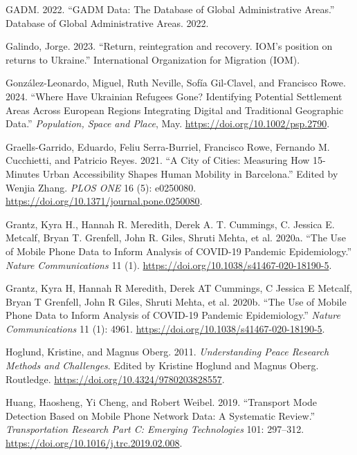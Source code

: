 \documentclass[
  sn-nature,
  11pt,
]{sn-jnl}
\newlength{\cslhangindent}
\newenvironment{CSLReferences}[2] %
 {\begin{list}{}{%
  \setlength{\itemindent}{0pt}
  \setlength{\leftmargin}{0pt}
  \setlength{\parsep}{0pt}
  \ifodd #1
   \setlength{\leftmargin}{\cslhangindent}
   \setlength{\itemindent}{-1\cslhangindent}
  \fi
  \setlength{\itemsep}{#2\baselineskip}}}
 {\end{list}}
\begin{document}
\begin{CSLReferences}{1}{0}
GADM. 2022. {``{GADM} Data: The Database of Global Administrative
Areas.''} Database of Global Administrative Areas. 2022.

Galindo, Jorge. 2023. {``{Return, reintegration and recovery. IOM's
position on returns to Ukraine}.''} {International Organization for
Migration (IOM)}.

González-Leonardo, Miguel, Ruth Neville, Sofía Gil-Clavel, and Francisco
Rowe. 2024. {``Where Have Ukrainian Refugees Gone? Identifying Potential
Settlement Areas Across European Regions Integrating Digital and
Traditional Geographic Data.''} \emph{Population, Space and Place}, May.
\url{https://doi.org/10.1002/psp.2790}.

Graells-Garrido, Eduardo, Feliu Serra-Burriel, Francisco Rowe, Fernando
M. Cucchietti, and Patricio Reyes. 2021. {``A City of Cities: Measuring
How 15-Minutes Urban Accessibility Shapes Human Mobility in
Barcelona.''} Edited by Wenjia Zhang. \emph{PLOS ONE} 16 (5): e0250080.
\url{https://doi.org/10.1371/journal.pone.0250080}.

Grantz, Kyra H., Hannah R. Meredith, Derek A. T. Cummings, C. Jessica E.
Metcalf, Bryan T. Grenfell, John R. Giles, Shruti Mehta, et al. 2020a.
{``The Use of Mobile Phone Data to Inform Analysis of COVID-19 Pandemic
Epidemiology.''} \emph{Nature Communications} 11 (1).
\url{https://doi.org/10.1038/s41467-020-18190-5}.

Grantz, Kyra H, Hannah R Meredith, Derek AT Cummings, C Jessica E
Metcalf, Bryan T Grenfell, John R Giles, Shruti Mehta, et al. 2020b.
{``The Use of Mobile Phone Data to Inform Analysis of {COVID-19}
Pandemic Epidemiology.''} \emph{Nature Communications} 11 (1): 4961.
\url{https://doi.org/10.1038/s41467-020-18190-5}.

Hoglund, Kristine, and Magnus Oberg. 2011. \emph{Understanding Peace
Research Methods and Challenges}. Edited by Kristine Hoglund and Magnus
Oberg. Routledge. \url{https://doi.org/10.4324/9780203828557}.

Huang, Haosheng, Yi Cheng, and Robert Weibel. 2019. {``Transport Mode
Detection Based on Mobile Phone Network Data: {A} Systematic Review.''}
\emph{Transportation Research Part C: Emerging Technologies} 101:
297--312. \url{https://doi.org/10.1016/j.trc.2019.02.008}.


\end{CSLReferences}
\end{document}
